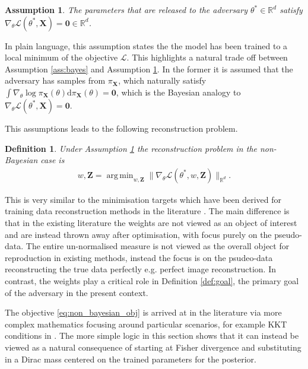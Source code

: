 \documentclass[hyperref]{article}
\theoremstyle{plain}
\newtheorem{definition}[theorem]{Definition}
\newtheorem{assumption}[theorem]{Assumption}
\theoremstyle{remark}
\newcommand{\bX}{\mathbf{X}}
\newcommand{\bZ}{\mathbf{Z}}
\newcommand{\bbR}{\mathbb{R}}
\newcommand{\calL}{\mathcal{L}}
\DeclareMathOperator*{\argmin}{arg\,min}
\begin{document}
\begin{assumption}\label{ass:param}
	The parameters that are released to the adversary $\theta^{*}\in\bbR^{d}$ satisfy $\nabla_{\theta}\calL(\theta^{*},\bX) = \mathbf{0}\in\bbR^{d}$.
\end{assumption}

In plain language, this assumption states the the model has been trained to a local minimum of the objective $\calL$. This highlights a natural trade off between Assumption \ref{ass:bayes} and Assumption \ref{ass:param}. In the former it is assumed that the adversary has samples from $\pi_{\bX}$, which naturally satisfy $\int\nabla_{\theta}\log\pi_{\bX}(\theta)\mathrm{d}\pi_{\bX}(\theta) = \mathbf{0}$, which is the Bayesian analogy to $\nabla_{\theta}\calL(\theta^{*},\bX) = \mathbf{0}$.


This assumptions leads to the following reconstruction problem.
\begin{definition}\label{def:non_Bayes_goal}
	Under Assumption \ref{ass:param} the reconstruction problem in the non-Bayesian case is 
	\begin{align}\label{eq:non_bayesian_obj}
		w,\bZ = \argmin_{w,\bZ}\lVert \nabla_{\theta}\calL(\theta^{*},w,\bZ)\rVert_{\bbR^{d}}.
		\end{align}
\end{definition}  

This is very similar to the minimisation targets which have been derived for training data reconstruction methods in the literature \citep{Haim2022,Loo2023, buzaglo2023deconstructing}. The main difference is that in the existing literature the weights are not viewed as an object of interest and are instead thrown away after optimisation, with focus purely on the pseudo-data. The entire un-normalised measure is not viewed as the overall object for reproduction in existing methods, instead the focus is on the psudeo-data reconstructing the true data perfectly e.g. perfect image reconstruction. In contrast, the weights play a critical role in Definition \ref{def:goal}, the primary goal of the adversary in the present context.

The objective \eqref{eq:non_bayesian_obj} is arrived at in the literature via more complex mathematics focusing around particular scenarios, for example KKT conditions in \citet{Haim2022}. The more simple logic in this section shows that it can instead be viewed as a natural consequence of starting at Fisher divergence and substituting in a Dirac mass centered on the trained parameters for the posterior. 
\end{document}
